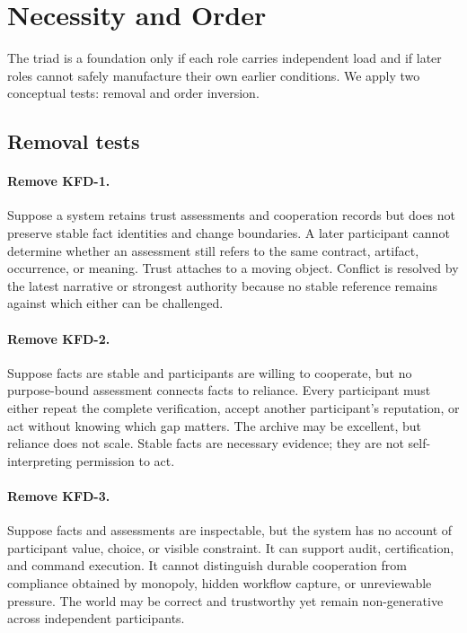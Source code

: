 \section{Necessity and Order}
\label{sec:necessity}

The triad is a foundation only if each role carries independent load and if
later roles cannot safely manufacture their own earlier conditions. We apply
two conceptual tests: removal and order inversion.

\subsection{Removal tests}

\paragraph{Remove KFD-1.}
Suppose a system retains trust assessments and cooperation records but does
not preserve stable fact identities and change boundaries. A later participant
cannot determine whether an assessment still refers to the same contract,
artifact, occurrence, or meaning. Trust attaches to a moving object. Conflict
is resolved by the latest narrative or strongest authority because no stable
reference remains against which either can be challenged.

\paragraph{Remove KFD-2.}
Suppose facts are stable and participants are willing to cooperate, but no
purpose-bound assessment connects facts to reliance. Every participant must
either repeat the complete verification, accept another participant's
reputation, or act without knowing which gap matters. The archive may be
excellent, but reliance does not scale. Stable facts are necessary evidence;
they are not self-interpreting permission to act.

\paragraph{Remove KFD-3.}
Suppose facts and assessments are inspectable, but the system has no account of
participant value, choice, or visible constraint. It can support audit,
certification, and command execution. It cannot distinguish durable
cooperation from compliance obtained by monopoly, hidden workflow capture, or
unreviewable pressure. The world may be correct and trustworthy yet remain
non-generative across independent participants.

